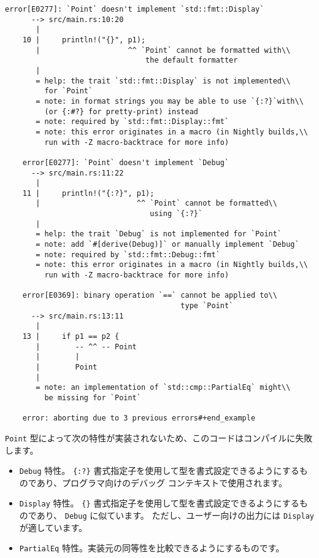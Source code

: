 \begin{lstlisting}[numbers=none]
    error[E0277]: `Point` doesn't implement `std::fmt::Display`
      --> src/main.rs:10:20
       |
    10 |     println!("{}", p1);
       |                    ^^ `Point` cannot be formatted with\\
                                the default formatter
       |
       = help: the trait `std::fmt::Display` is not implemented\\
         for `Point`
       = note: in format strings you may be able to use `{:?}`with\\
         (or {:#?} for pretty-print) instead
       = note: required by `std::fmt::Display::fmt`
       = note: this error originates in a macro (in Nightly builds,\\
         run with -Z macro-backtrace for more info)

    error[E0277]: `Point` doesn't implement `Debug`
      --> src/main.rs:11:22
       |
    11 |     println!("{:?}", p1);
       |                      ^^ `Point` cannot be formatted\\
                                 using `{:?}`
       |
       = help: the trait `Debug` is not implemented for `Point`
       = note: add `#[derive(Debug)]` or manually implement `Debug`
       = note: required by `std::fmt::Debug::fmt`
       = note: this error originates in a macro (in Nightly builds,\\
         run with -Z macro-backtrace for more info)

    error[E0369]: binary operation `==` cannot be applied to\\
                                        type `Point`
      --> src/main.rs:13:11
       |
    13 |     if p1 == p2 {
       |        -- ^^ -- Point
       |        |
       |        Point
       |
       = note: an implementation of `std::cmp::PartialEq` might\\
         be missing for `Point`

    error: aborting due to 3 previous errors#+end_example
\end{lstlisting}

\texttt{Point} 型によって次の特性が実装されないため、このコードはコンパイルに失敗します。
\begin{itemize}
\item \texttt{Debug} 特性。 \texttt{\{:?\}} 書式指定子を使用して型を書式設定できるようにするものであり、プログラマ向けのデバッグ コンテキストで使用されます。
\item \texttt{Display} 特性。 \texttt{\{\}} 書式指定子を使用して型を書式設定できるようにするものであり、 \texttt{Debug} に似ています。 ただし、ユーザー向けの出力には \texttt{Display} が適しています。
\item \texttt{PartialEq} 特性。実装元の同等性を比較できるようにするものです。
\end{itemize}

